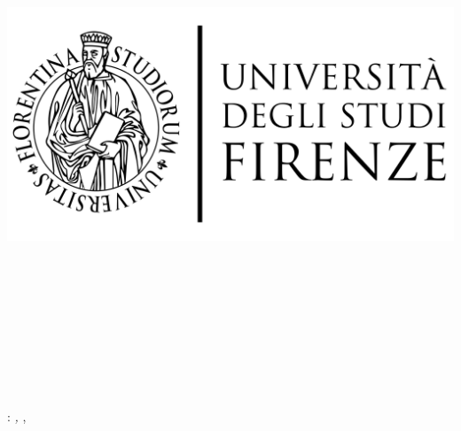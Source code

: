 \begin{titlepage}
	\begin{center}
   	\large
      \hfill
      \vfill
      \begingroup
         \includegraphics[scale=0.15]{logo/LOGO}\\
			\myFaculty \\
			\myDegree \\ 
			\vspace{0.5cm}
         \vspace{0.5cm}    
           
      \endgroup 
      \vfill 
      \begingroup
      	\color{Maroon}\spacedallcaps{\myItalianTitle} \\ $\ $\\
	\bigskip
      \endgroup
      \spacedlowsmallcaps{\myName} \\ $\ $\\
      \spacedlowsmallcaps{\myProf} \\ $\ $
      \spacedlowsmallcaps{\myOtherProf}
      \vfill 
      \vfill
    
      \vfill
      \vfill
      \myTime
      \vfill                      
	\end{center}        
\end{titlepage}   
   \newpage
	\thispagestyle{empty}
	\hfill
	\vfill
	\noindent\myName: 
	\textit{\myItalianTitle,} 
	\myDegree, \textcopyright\ \myTime
